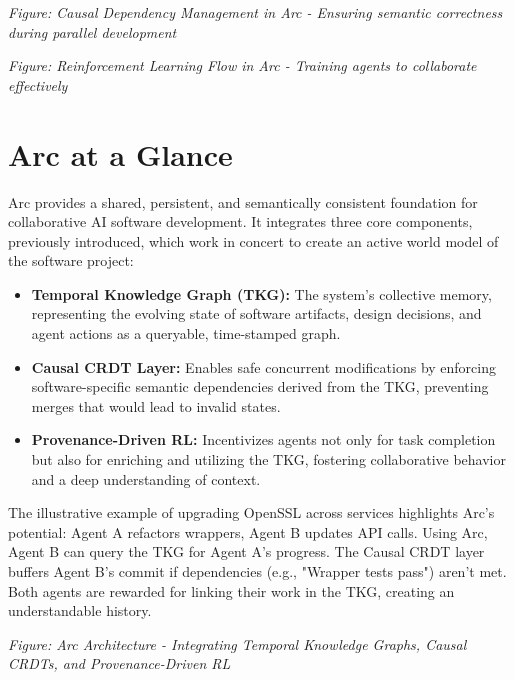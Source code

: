 \documentclass{article}
\begin{document}

\begin{center}
\textit{Figure: Causal Dependency Management in Arc - Ensuring semantic correctness during parallel development}
\end{center}


\begin{center}
\textit{Figure: Reinforcement Learning Flow in Arc - Training agents to collaborate effectively}
\end{center}



\section{Arc at a Glance}
Arc provides a shared, persistent, and semantically consistent foundation for collaborative AI software development. It integrates three core components, previously introduced, which work in concert to create an active world model of the software project:
\begin{itemize}
    \item \textbf{Temporal Knowledge Graph (TKG):} The system's collective memory, representing the evolving state of software artifacts, design decisions, and agent actions as a queryable, time-stamped graph.
    \item \textbf{Causal CRDT Layer:} Enables safe concurrent modifications by enforcing software-specific semantic dependencies derived from the TKG, preventing merges that would lead to invalid states.
    \item \textbf{Provenance-Driven RL:} Incentivizes agents not only for task completion but also for enriching and utilizing the TKG, fostering collaborative behavior and a deep understanding of context.
\end{itemize}
The illustrative example of upgrading OpenSSL across services highlights Arc's potential: Agent A refactors wrappers, Agent B updates API calls. Using Arc, Agent B can query the TKG for Agent A's progress. The Causal CRDT layer buffers Agent B's commit if dependencies (e.g., "Wrapper tests pass") aren't met. Both agents are rewarded for linking their work in the TKG, creating an understandable history.


\begin{center}
\textit{Figure: Arc Architecture - Integrating Temporal Knowledge Graphs, Causal CRDTs, and Provenance-Driven RL}
\end{center}
\end{document}
